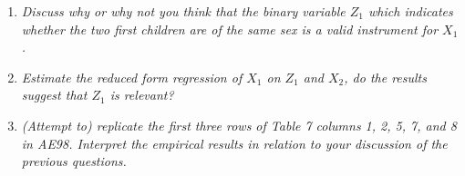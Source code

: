 \documentclass[12pt,oneside,reqno]{amsart}
\begin{document}
\begin{enumerate}[label = (\roman*)]
\item \textit{Discuss why or why not you think that the binary variable $Z_1$ which indicates whether the two first children are of the same sex is a valid instrument for $X_1$.}


\item \textit{Estimate the reduced form regression of $X_1$ on $Z_1$ and $X_2$, do the results suggest that $Z_1$ is relevant?}


\item \textit{(Attempt to) replicate the first three rows of Table 7 columns 1, 2, 5, 7, and 8 in AE98. Interpret the empirical results in relation to your discussion of the previous questions.}

\end{enumerate}
\end{document}
